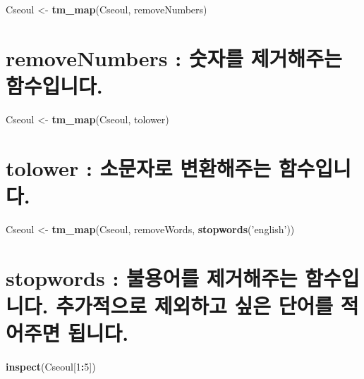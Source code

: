 \documentclass[]{article}
\newenvironment{Shaded}{\begin{snugshade}}{\end{snugshade}}
\newcommand{\KeywordTok}[1]{\textcolor[rgb]{0.13,0.29,0.53}{\textbf{#1}}}
\newcommand{\DecValTok}[1]{\textcolor[rgb]{0.00,0.00,0.81}{#1}}
\newcommand{\StringTok}[1]{\textcolor[rgb]{0.31,0.60,0.02}{#1}}
\newcommand{\OperatorTok}[1]{\textcolor[rgb]{0.81,0.36,0.00}{\textbf{#1}}}
\newcommand{\NormalTok}[1]{#1}
\begin{document}
\begin{Shaded}
\begin{Highlighting}[]
\NormalTok{Cseoul <-}\StringTok{ }\KeywordTok{tm_map}\NormalTok{(Cseoul, removeNumbers)}
\end{Highlighting}
\end{Shaded}

\section{removeNumbers : 숫자를 제거해주는
함수입니다.}\label{removenumbers---.}

\begin{Shaded}
\begin{Highlighting}[]
\NormalTok{Cseoul <-}\StringTok{ }\KeywordTok{tm_map}\NormalTok{(Cseoul, tolower)}
\end{Highlighting}
\end{Shaded}

\section{tolower : 소문자로 변환해주는 함수입니다.}\label{tolower---.}

\begin{Shaded}
\begin{Highlighting}[]
\NormalTok{Cseoul <-}\StringTok{ }\KeywordTok{tm_map}\NormalTok{(Cseoul, removeWords, }\KeywordTok{stopwords}\NormalTok{(}\StringTok{'english'}\NormalTok{))}
\end{Highlighting}
\end{Shaded}

\section{stopwords : 불용어를 제거해주는 함수입니다. 추가적으로 제외하고
싶은 단어를 적어주면 됩니다.}\label{stopwords---.------.}

\begin{Shaded}
\begin{Highlighting}[]
\KeywordTok{inspect}\NormalTok{(Cseoul[}\DecValTok{1}\OperatorTok{:}\DecValTok{5}\NormalTok{])}
\end{Highlighting}
\end{Shaded}
\end{document}
